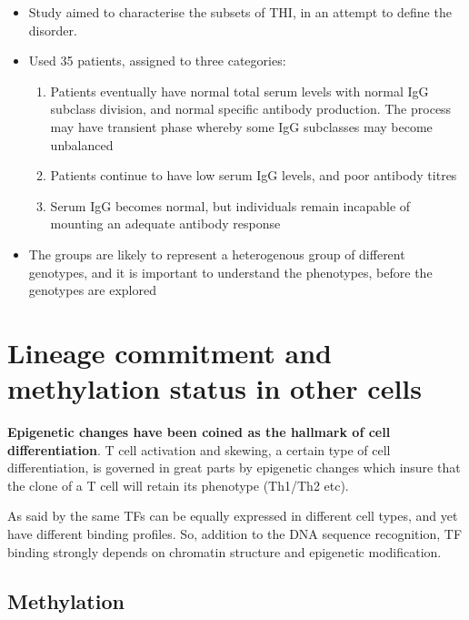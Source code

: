 \documentclass[12pt]{article}
\begin{document}
	\begin{itemize}
		\item Study aimed to characterise the subsets of THI, in an attempt to define the disorder. 
		\item Used 35 patients, assigned to three categories:
		\begin{enumerate}
			\item Patients eventually have normal total serum levels with normal IgG subclass division, and normal specific antibody production. The process may have transient phase whereby some IgG subclasses may become unbalanced 
			\item Patients continue to have low serum IgG levels, and poor antibody titres
			\item Serum IgG becomes normal, but individuals remain incapable of mounting an adequate antibody response
		\end{enumerate}
		\item The groups are likely to represent a heterogenous group of different genotypes, and it is important to understand the phenotypes, before the genotypes are explored
	\end{itemize}
	
	\section{Lineage commitment and methylation status in other cells}
	
	{\bf Epigenetic changes have been coined as the hallmark of cell differentiation}. T cell activation and skewing, a certain type of cell differentiation, is governed in great parts by epigenetic changes which insure that the clone of a T cell will retain its phenotype (Th1/Th2 etc).
	
	As said by \citet{Choukrallah14} the same TFs can be equally expressed in different cell types, and yet have different binding profiles. So, addition to the DNA sequence recognition, TF binding strongly depends on chromatin structure and epigenetic modification.
	
	\subsection{Methylation}
	
\end{document}
